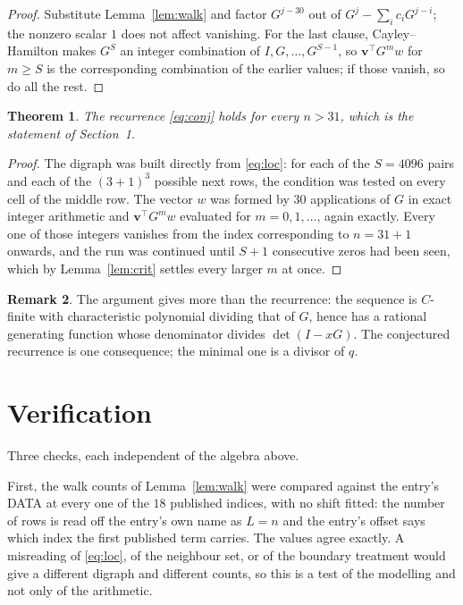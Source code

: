\documentclass[11pt,a4paper]{article}
\theoremstyle{plain}
\newtheorem{theorem}{Theorem}
\theoremstyle{definition}
\newtheorem{remark}[theorem]{Remark}
\begin{document}
\begin{proof}
Substitute Lemma~\ref{lem:walk} and factor $G^{j-30}$ out of
$G^{j}-\sum_ic_iG^{j-i}$; the nonzero scalar $1$ does not affect
vanishing. For the last clause, Cayley--Hamilton makes $G^{S}$ an integer combination of
$I,G,\dots,G^{S-1}$, so $\mathbf{v}^{\!\top}G^{m}w$ for $m\ge S$ is the corresponding
combination of the earlier values; if those vanish, so do all the rest.
\end{proof}

\begin{theorem}
The recurrence \eqref{eq:conj} holds for every $n>31$, which is the statement of
Section~1.
\end{theorem}

\begin{proof}
The digraph was built directly from \eqref{eq:loc}: for each of the $S=4096$ pairs and each
of the $(3+1)^{3}$ possible next rows, the condition was tested on every cell of
the middle row. The vector $w$ was formed by $30$ applications of $G$ in exact integer
arithmetic and $\mathbf{v}^{\!\top}G^{m}w$ evaluated for $m=0,1,\dots$, again exactly.
Every one of those integers vanishes from the index corresponding to $n=31+1$ onwards,
and the run was continued until $S+1$ consecutive zeros had been seen, which by
Lemma~\ref{lem:crit} settles every larger $m$ at once.
\end{proof}

\begin{remark}
The argument gives more than the recurrence: the sequence is $C$-finite with characteristic
polynomial dividing that of $G$, hence has a rational generating function whose denominator
divides $\det(I-xG)$. The conjectured recurrence is one consequence; the minimal one is a
divisor of $q$.
\end{remark}

\section{Verification}

Three checks, each independent of the algebra above.

First, the walk counts of Lemma~\ref{lem:walk} were compared against the entry's DATA at
every one of the $18$ published indices, with no shift fitted: the number of rows is
read off the entry's own name as $L=n$ and the entry's offset says which index the first
published term carries. The values agree exactly. A misreading of \eqref{eq:loc}, of the
neighbour set, or of the boundary treatment would give a different digraph and different
counts, so this is a test of the modelling and not only of the arithmetic.
\end{document}
